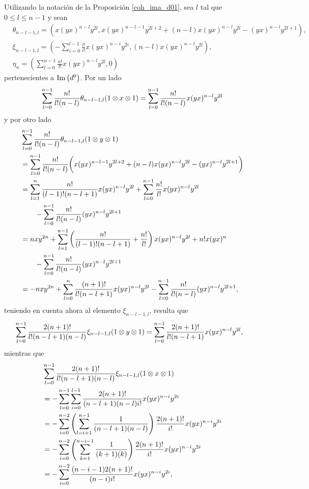 \documentclass[fleqn,../tesis.tex]{subfiles}
\begin{document}
Utilizando la notación de la Proposición \ref{coh_ima_d01}, sea $l$ tal que $0 \leq l \leq n - 1$ y sean
\begin{align*}
	&\theta_{n - l - 1, l} = \left(x(yx)^{n - l}y^{2l}, x(yx)^{n - l - 1}y^{2l + 2}
		 + (n - l)x(yx)^{n - l}y^{2l} -(yx)^{n - l}y^{2l + 1}\right),\\
	&\xi_{n - l - 1, l} = \left(-\sum_{i = 0}^{l - 1}\frac{l!}{i!}x(yx)^{n - i}y^{2i},
		(n - l)x(yx)^{n - l}y^{2l}\right),\\
	&\eta_n = \left(\sum_{l = 0}^{n - 1}\frac{n!}{l!}x(yx)^{n -l}y^{2l}, 0\right)
\end{align*}
pertenecientes a $\operatorname{Im}\left(d^{0}\right)$. Por un lado
\begin{align*}
	\sum_{l = 0}^{n - 1}\frac{n!}{l!(n - l)}\theta_{n - l - 1, l}(1 \otimes x \otimes 1)
		= \sum_{l = 0}^{n - 1}\frac{n!}{l!(n - l)}x(yx)^{n - l}y^{2l}
\end{align*}
y por otro lado
\begin{align*}
	&\sum_{l = 0}^{n - 1}\frac{n!}{l!(n - l)}\theta_{n - l - 1, l}(1 \otimes y \otimes 1)\\
	&= \sum_{l = 0}^{n - 1}\frac{n!}{l!(n - l)}\bigg(x(yx)^{n - l - 1}y^{2l + 2}
	+ (n - l)x(yx)^{n - l}y^{2l}-(yx)^{n - l}y^{2l + 1}\bigg)\\
	&= \sum_{l = 1}^{n}\frac{n!}{(l - 1)!(n - l + 1)}x(yx)^{n - l}y^{2l}
		 + \sum_{l = 0}^{n - 1}\frac{n!}{l!}x(yx)^{n - l}y^{2l}\\
	&\qquad -\sum_{l = 0}^{n - 1}\frac{n!}{l!(n - l)}(yx)^{n - l}y^{2l + 1}\\
	&= nxy^{2n} + \sum_{l = 1}^{n -1}\left(\frac{n!}{(l - 1)!(n - l + 1)}
		+ \frac{n!}{l!}\right)x(yx)^{n - l}y^{2l} + n!x(yx)^{n}\\
	&\qquad -\sum_{l = 0}^{n - 1}\frac{n!}{l!(n - l)}(yx)^{n - l}y^{2l + 1}\\
	&= -nxy^{2n} + \sum_{l = 0}^{n}\frac{(n + 1)!}{l!(n - l + 1)} x(yx)^{n - l}y^{2l}
		-\sum_{l = 0}^{n - 1}\frac{n!}{l!(n - l)}(yx)^{n - l}y^{2l + 1},
\end{align*}
teniendo en cuenta ahora al elemento $\xi_{n - l - 1, l}$, resulta que
\begin{align*}
	&\sum_{l = 0}^{n - 1}\frac{2(n + 1)!}{l!(n - l + 1)(n -l)}\xi_{n - l - 1, l}(1\otimes y\otimes 1)
		=\sum_{l = 0}^{n - 1}\frac{2(n + 1)!}{l!(n - l + 1)}x(yx)^{n - l}y^{2l},
\end{align*}
mientras que
\begin{align*}
	&\sum_{l = 0}^{n - 1}\frac{2(n + 1)!}{l!(n - l + 1)(n -l)}\xi_{n - l - 1, l}(1\otimes x\otimes 1)\\
	&=-\sum_{l = 0}^{n - 1}\sum_{i = 0}^{l-1}\frac{2(n + 1)!}{(n -l + 1)(n - l)i!}x(yx)^{n -i}y^{2i}\\
	&=-\sum_{i = 0}^{n - 2}\left(\sum_{l = i + 1}^{n - 1}\frac{1}{(n -l + 1)(n - l)}\right)
		\frac{2(n + 1)!}{i!}x(yx)^{n - i}y^{2i}\\
	&=-\sum_{i = 0}^{n - 2}\left(\sum_{k = 1}^{n - i- 1}\frac{1}{(k + 1)(k)}\right)
		\frac{2(n + 1)!}{i!}x(yx)^{n - i}y^{2i}\\
	&=-\sum_{i = 0}^{n - 2}\frac{(n - i - 1)2(n + 1)!}{(n - i)i!}x(yx)^{n - i}y^{2i},
\end{align*}
\end{document}
